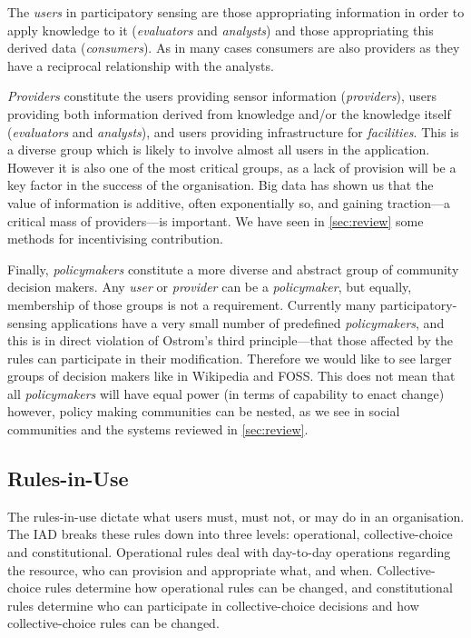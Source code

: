 The \emph{users} in participatory sensing are those appropriating information in order to apply knowledge to it (\emph{evaluators} and \emph{analysts}) and those appropriating this derived data (\emph{consumers}). As in many cases consumers are also providers as they have a reciprocal relationship with the analysts.

\emph{Providers} constitute the users providing sensor information (\emph{providers}), users providing both information derived from knowledge and/or the knowledge itself (\emph{evaluators} and \emph{analysts}), and users providing infrastructure for \emph{facilities}. This is a diverse group which is likely to involve almost all users in the application. However it is also one of the most critical groups, as a lack of provision will be a key factor in the success of the organisation. Big data has shown us that the value of information is additive, often exponentially so, and gaining traction---a critical mass of providers---is important. 
We have seen in \autoref{sec:review} some methods for incentivising contribution.

Finally, \emph{policymakers} constitute a more diverse and abstract group of community decision makers. Any \emph{user} or \emph{provider} can be a \emph{policymaker}, but equally, membership of those groups is not a requirement. 
Currently many participatory-sensing applications have a very small number of predefined \emph{policymakers}, and this is in direct violation of Ostrom's third principle---that those affected by the rules can participate in their modification. 
Therefore we would like to see larger groups of decision makers like in Wikipedia and \ac{FOSS}. This does not mean that all \emph{policymakers} will have equal power (in terms of capability to enact change) however, policy making communities can be nested, as we see in social communities and the systems reviewed in \autoref{sec:review}.


\subsection{Rules-in-Use}

The rules-in-use dictate what users must, must not, or may do in an organisation. The \ac{IAD} breaks these rules down into three levels: operational, collective-choice and constitutional. Operational rules deal with day-to-day operations regarding the resource, who can provision and appropriate what, and when. 
Collective-choice rules determine how operational rules can be changed, and constitutional rules determine who can participate in collective-choice decisions and how collective-choice rules can be changed.

